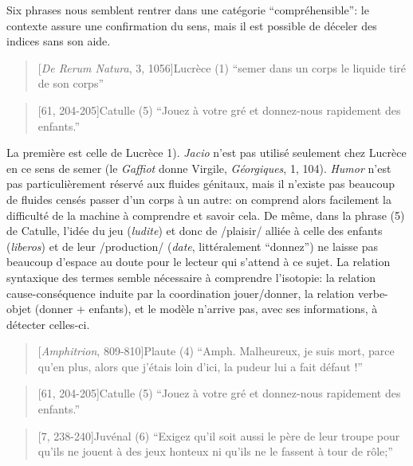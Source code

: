 \starbreak

Six phrases nous semblent rentrer dans une catégorie \enquote{compréhensible}: le contexte assure une confirmation du sens, mais il est possible de déceler des indices sans son aide.

\begin{quote}[\textit{De Rerum Natura}, 3, 1056]{Lucrèce}
    (1) \enquote{semer dans un corps le liquide tiré de son corps}
\end{quote}

\begin{quote}[61, 204-205]{Catulle}
     (5) \enquote{Jouez à votre gré et donnez-nous rapidement des enfants.}
\end{quote}

La première est celle de Lucrèce 1). \textit{Jacio} n'est pas utilisé seulement chez Lucrèce en ce sens de semer (le \textit{Gaffiot} donne Virgile, \textit{Géorgiques}, 1, 104). \textit{Humor} n'est pas particulièrement réservé aux fluides génitaux, mais il n'existe pas beaucoup de fluides censés passer d'un corps à un autre: on comprend alors facilement la difficulté de la machine à comprendre et savoir cela. De même, dans la phrase (5) de Catulle, l'idée du jeu (\textit{ludite}) et donc de /plaisir/ alliée à celle des enfants (\textit{liberos}) et de leur /production/ (\textit{date}, littéralement \enquote{donnez}) ne laisse pas beaucoup d'espace au doute pour le lecteur qui s'attend à ce sujet. La relation syntaxique des termes semble nécessaire à comprendre l'isotopie: la relation cause-conséquence induite par la coordination jouer/donner, la relation verbe-objet (donner + enfants), et le modèle n'arrive pas, avec ses informations, à détecter celles-ci.


\begin{quote}[\textit{Amphitrion}, 809-810]{Plaute}
	(4) \enquote{Amph. Malheureux, je suis mort, parce qu’en plus, alors que j’étais loin d’ici, la pudeur lui a fait défaut !}
\end{quote}

\begin{quote}[61, 204-205]{Catulle}
	(5) \enquote{Jouez à votre gré et donnez-nous rapidement des enfants.}

\end{quote}

\begin{quote}[7, 238-240]{Juvénal}
	(6) \enquote{Exigez qu’il soit aussi le père de leur troupe pour qu’ils ne jouent à des jeux honteux ni qu’ils ne le fassent à tour de rôle;}
\end{quote}

